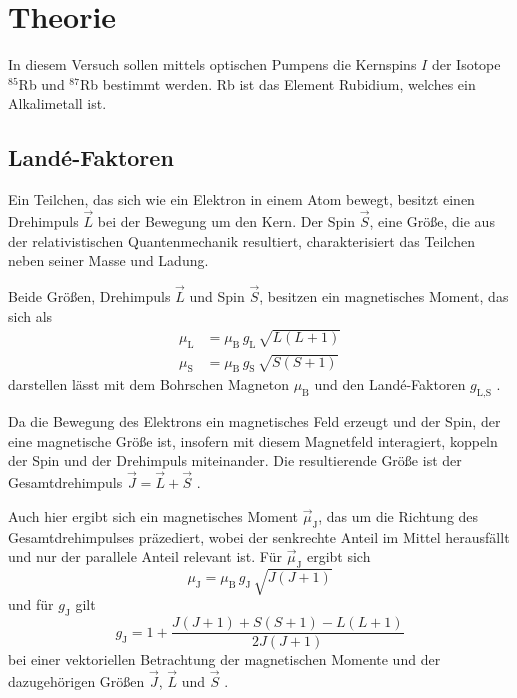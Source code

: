 \section{Theorie}
\label{sec:Theorie}
In diesem Versuch sollen mittels optischen Pumpens die Kernspins $I$ der Isotope $^{85}$Rb und $^{87}$Rb bestimmt werden. Rb ist das Element Rubidium, welches ein Alkalimetall ist.

\subsection{Landé-Faktoren}

Ein Teilchen, das sich wie ein Elektron in einem Atom bewegt, besitzt einen Drehimpuls $\vec L$ bei der Bewegung um den Kern.
Der Spin $\vec S$, eine Größe, die aus der relativistischen Quantenmechanik resultiert, charakterisiert das Teilchen neben seiner Masse und Ladung. 

Beide Größen, Drehimpuls $\vec L$ und Spin $\vec S$, besitzen ein magnetisches Moment, das sich als 
\begin{align*}
    \mu_\text{L} &= \mu_\text{B} \, g_\text{L} \, \sqrt{L(L+1)} \\ 
    \mu_\text{S} &= \mu_\text{B} \, g_\text{S} \, \sqrt{S(S+1)}
\end{align*}
darstellen lässt mit dem Bohrschen Magneton $\mu_\text{B}$ und den Landé-Faktoren $g_\text{L,S}$ \cite{pfeiler}. 

Da die Bewegung des Elektrons ein magnetisches Feld erzeugt und der Spin, der eine magnetische Größe ist, insofern mit diesem Magnetfeld interagiert, koppeln der Spin und der Drehimpuls miteinander. 
Die resultierende Größe ist der Gesamtdrehimpuls $\vec J = \vec L + \vec S$ \cite{pfeiler}.

Auch hier ergibt sich ein magnetisches Moment $\vec \mu_\text{J}$, das um die Richtung des Gesamtdrehimpulses präzediert, wobei der senkrechte Anteil im Mittel herausfällt und nur der parallele Anteil relevant ist. 
Für $\vec \mu_\text{J}$ ergibt sich 
\begin{equation*}
    \mu_\text{J} = \mu_\text{B} \, g_\text{J} \, \sqrt{J(J+1)}
\end{equation*}
und für $g_\text{J}$ gilt 
\begin{equation}
    g_\text{J} = 1 + \frac{J(J+1) + S(S+1) - L(L+1)}{2J(J+1)}
    \label{eq:gj}
\end{equation}
bei einer vektoriellen Betrachtung der magnetischen Momente und der dazugehörigen Größen $\vec J$, $\vec L$ und $\vec S$ \cite{caltech}.

